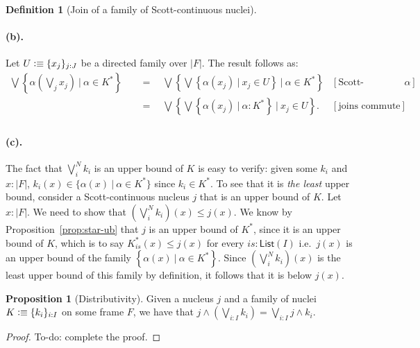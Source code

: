 \documentclass[a4paper, 11pt]{article}
\theoremstyle{definition}
\newtheorem{prop}{Proposition}
\newtheorem{defn}{Definition}
\newcommand{\setof}[1]{\left\{ #1 \right\}}
\newcommand{\is}{\vcentcolon\equiv}
\newcommand{\todo}[1]{{\large\color{orange}\textsf{To-do: #1.}}}
\begin{document}
\begin{defn}[Join of a family of Scott-continuous nuclei]
  \paragraph{(b).} Let $U \is \{ x_j \}_{j : J}$ be a directed family over $| F |$. The result follows
  as:
  \begin{align*}
       \bigvee \setof{ \alpha\left(\bigvee_j x_j\right) ~|~ \alpha \in K^* }
  &\quad=\quad \bigvee \setof{ \bigvee \setof{ \alpha(x_j) ~|~ x_j \in U } ~|~ \alpha \in K^* }  & [\text{Scott-continuity of $\alpha$}] \\
  &\quad=\quad \bigvee \setof{ \bigvee \setof{ \alpha(x_j) ~|~ \alpha : K^* } ~|~ x_j \in U }. & [\text{joins commute}]          \\
  \end{align*}

  \paragraph{(c).} The fact that $\bigvee^N_i k_i$ is an upper bound of $K$ is easy to verify:
  given some $k_i$ and $x : | F |$, $k_i(x) \in \{ \alpha(x) ~|~ \alpha \in K^* \}$ since $k_i \in K^*$. To see that
  it is \emph{the least} upper bound, consider a Scott-continuous nucleus $j$ that is an upper bound
  of $K$. Let $x : | F |$. We need to show that $\left(\bigvee^N_i k_i\right)(x) \le j(x)$. We know by
  Proposition~\ref{prop:star-ub} that $j$ is an upper bound of $K^*$, since it is an upper bound of
  $K$, which is to say $K^*_{is}(x) \le j(x)$ for every $is : \mathsf{List}(I)$ i.e.\ $j(x)$ is an
  upper bound of the family $\setof{ \alpha(x) ~|~ \alpha \in K^* }$. Since $\left(\bigvee^N_i k_i\right)(x)$ is the
  least upper bound of this family by definition, it follows that it is below $j(x)$.
\end{defn}

\begin{prop}[Distributivity]
  Given a nucleus $j$ and a family of nuclei $K \is \{ k_i \}_{i : I}$ on some frame $F$, we have
  that $j \wedge \left(\bigvee_{i : I} k_i\right) = \bigvee_{i : I} j \wedge k_i$.
\end{prop}
\begin{proof}
  \todo{complete the proof}
\end{proof}

\printbibliography
\end{document}
